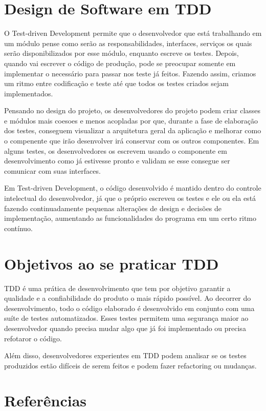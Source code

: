 \documentclass{article}
\begin{document}
  \section{Design de Software em TDD}

  O Test-driven Development permite que o desenvolvedor que está trabalhando 
  em um módulo pense como serão as responsabilidades, interfaces, serviços os 
  quais serão disponibilizados por esse módulo, enquanto escreve os testes. 
  Depois, quando vai escrever o código de produção, pode se preocupar somente em
  implementar o necessário para passar nos teste já feitos. Fazendo assim, 
  criamos um ritmo entre codificação e teste até que todos os testes criados 
  sejam implementados.

  Pensando no design do projeto, os desenvolvedores do projeto podem criar
  classes e módulos mais coesoes e menos acopladas por que, durante a fase de 
  elaboração dos testes, conseguem visualizar a arquitetura geral da aplicação e
  melhorar como o compenente que irão desenvolver irá conservar com os outros 
  componentes. Em alguns testes, os desenvolvedores os escrevem usando o 
  componente em desenvolvimento como já estivesse pronto e validam se
  esse consegue ser comunicar com suas interfaces.

  Em Test-driven Development, o código desenvolvido é mantido dentro do controle
  intelectual do desenvolvedor, já que o próprio escreveu os testes e ele ou 
  ela está fazendo continuadamente pequenas alterações de design e decisões de 
  implementação, aumentando as funcionalidades do programa em um certo ritmo 
  contínuo.

  \section{Objetivos ao se praticar TDD}

  TDD é uma prática de desenvolvimento que tem por objetivo garantir a
  qualidade e a confiabilidade do produto o mais rápido possível. Ao decorrer do
  desenvolvimento, todo o código elaborado é desenvolvido em conjunto com uma
  suíte de testes automatizados. Esses testes permitem uma segurança maior ao
  desenvolvedor quando precisa mudar algo que já foi implementado ou precisa 
  refotaror o código.

  Além disso, desenvolvedores experientes em TDD podem analisar se os testes 
  produzidos estão difíceis de serem feitos e podem fazer refactoring ou 
  mudanças.

  \section{Referências}
\end{document}
